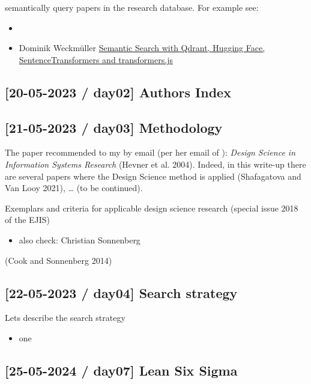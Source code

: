 \documentclass[
  letterpaper,
  DIV=11,
  numbers=noendperiod]{scrartcl}
\providecommand{\tightlist}{%
  \setlength{\itemsep}{0pt}\setlength{\parskip}{0pt}}\usepackage{longtable,booktabs,array}
\begin{document}
semantically query papers in the research database. For example see:

\begin{itemize}
\tightlist
\item
  \href{}{}
\item
  Dominik Weckmüller
  \href{https://geo.rocks/post/qdrant-transformers-js-semantic-search/}{Semantic
  Search with Qdrant, Hugging Face, SentenceTransformers and
  transformers.js}
\end{itemize}

\hypertarget{day02-authors-index}{%
\subsection{{[}20-05-2023 / day02{]} Authors
Index}\label{day02-authors-index}}

\hypertarget{day03-methodology}{%
\subsection{{[}21-05-2023 / day03{]}
Methodology}\label{day03-methodology}}

The paper recommended to my by email (per her email of ): \emph{Design
Science in Information Systems Research} (Hevner et al. 2004). Indeed,
in this write-up there are several papers where the Design Science
method is applied (Shafagatova and Van Looy 2021), \ldots{} (to be
continued).

Exemplars and criteria for applicable design science research (special
issue 2018 of the EJIS)

\begin{itemize}
\tightlist
\item
  also check: Christian Sonnenberg
\end{itemize}

(Cook and Sonnenberg 2014)

\hypertarget{day04-search-strategy}{%
\subsection{{[}22-05-2023 / day04{]} Search
strategy}\label{day04-search-strategy}}

Lets describe the search strategy

\begin{itemize}
\tightlist
\item
  one
\end{itemize}

\hypertarget{day07-lean-six-sigma}{%
\subsection{{[}25-05-2024 / day07{]} Lean Six
Sigma}\label{day07-lean-six-sigma}}
\end{document}
